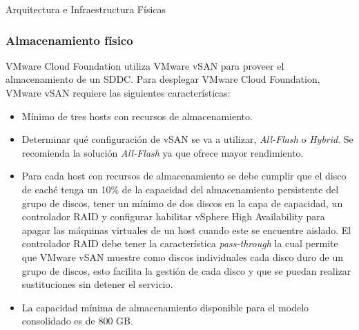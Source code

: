 \begin{subsection}{Arquitectura e Infraestructura Físicas \cite{CFfisInfraestuctura}}
\subsubsection{Almacenamiento físico}
VMware Cloud Foundation utiliza VMware vSAN para proveer el almacenamiento de un SDDC. Para desplegar VMware Cloud Foundation, VMware vSAN requiere las siguientes características:
\begin{itemize}
    \item Mínimo de tres hosts con recursos de almacenamiento.
    \item Determinar qué configuración de vSAN se va a utilizar, \textit{All-Flash} o \textit{Hybrid}. Se recomienda la solución \textit{All-Flash} ya que ofrece mayor rendimiento.
    \item Para cada host con recursos de almacenamiento se debe cumplir que el disco de caché tenga un 10\% de la capacidad del almacenamiento persistente del grupo de discos, tener un mínimo de dos discos en la capa de capacidad, un controlador RAID y configurar habilitar vSphere High Availability  para apagar las máquinas virtuales de un host cuando este se encuentre aislado. El controlador RAID debe tener la característica \textit{pass-through} la cual permite que VMware vSAN muestre como discos individuales cada disco duro de un grupo de discos, esto facilita la gestión de cada disco y que se puedan realizar sustituciones sin detener el servicio.
    \item La capacidad mínima de almacenamiento disponible para el modelo consolidado es de 800 GB. 
\end{itemize}

\end{subsection}



